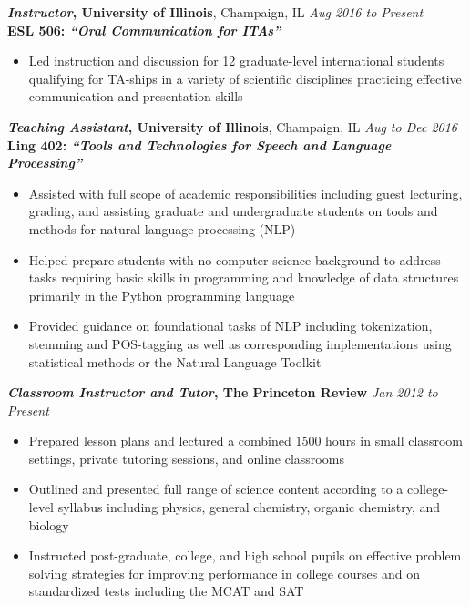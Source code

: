 \documentclass{article}
\begin{document}
\textbf{\textit{Instructor}, University of Illinois}, Champaign, IL
\hfill
\textit{Aug 2016 to Present}\\
\textbf{ESL 506: \textit{“Oral Communication for ITAs”}}
\vspace{-2mm}
\begin{itemize}
\itemsep-1.5mm
    \item Led instruction and discussion for 12 graduate-level international students qualifying for TA-ships in a variety of scientific disciplines practicing effective communication and presentation skills
\end{itemize}
\textbf{\textit{Teaching Assistant}, University of Illinois}, Champaign, IL
\hfill
\textit{Aug to Dec 2016}\\
\textbf{Ling 402: \textit{“Tools and Technologies for Speech and Language Processing”}}
\vspace{-2mm}
\begin{itemize}
\itemsep-1.5mm
    \item Assisted with full scope of academic responsibilities including guest lecturing, grading, and assisting graduate and undergraduate students on tools and methods for natural language processing (NLP)
    \item Helped prepare students with no computer science background to address tasks requiring basic skills in programming and knowledge of data structures primarily in the Python programming language
    \item Provided guidance on foundational tasks of NLP including tokenization, stemming and POS-tagging as well as corresponding implementations using statistical methods or the Natural Language Toolkit
\end{itemize}
\textbf{\textit{Classroom Instructor and Tutor}, The Princeton Review}
\hfill
\textit{Jan 2012 to Present}\\
\vspace{-6mm}
\begin{itemize}
\itemsep-1.5mm
    \item Prepared lesson plans and lectured a combined 1500 hours in small classroom settings, private tutoring sessions, and online classrooms
    \item Outlined and presented full range of science content according to a college-level syllabus including physics, general chemistry, organic chemistry, and biology
    \item Instructed post-graduate, college, and high school pupils on effective problem solving strategies for improving performance in college courses and on standardized tests including the MCAT and SAT
\end{itemize}
\end{document}
